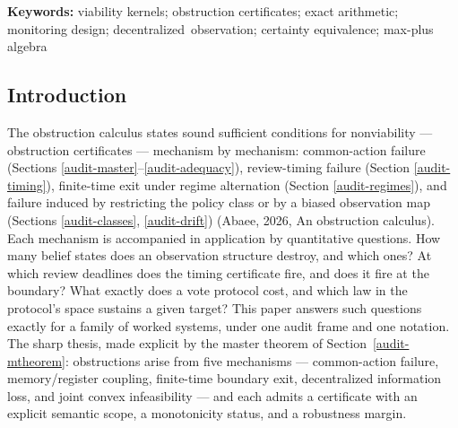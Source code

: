 \documentclass[10pt,twocolumn]{article}
\theoremstyle{plain}
\theoremstyle{definition}
\theoremstyle{remark}
\begin{document}
\begin{abstract}
margin \(0\)); at the audited obstructed aggregate \(Y = 6\) a
rational dual certificate prices the shortfall at margin \(3/50\). Static duality
holds at value \(-1/10\) on the two-floor instance with an \(\ell_1\)-normalized
Farkas pair, and a Helly-tight triple exhibits the sparse \(m{+}1\)-constraint witness. The complete result tables are carried here: the master table
of all 36 belief pairs against the five kernels, the sixteen sustaining
law pairs of the decentralized protocol (an exact \(4 \times 4\)
product), the 93-cell timing grid, the fifteen-partition census with
each fibre's common safe-action set, and the benchmark and drift tables,
with a five-figure set regenerated from the same scripts. Design rules
follow: review deadlines are boundary-inclusive; merged fibres call for
splits, not threshold tuning; aggregated indices support certainly-safe
reporting only; biased observation maps call for structural correction.
\end{abstract}

\textbf{Keywords:} viability kernels; obstruction certificates; exact
arithmetic; monitoring design; \mbox{decentralized observation}; certainty
equivalence; max-plus algebra

\subsection{Introduction}\label{audit-introduction}

The obstruction calculus states sound sufficient conditions for
nonviability --- obstruction certificates --- mechanism by mechanism:
common-action failure (Sections \ref{audit-master}--\ref{audit-adequacy}),
review-timing failure (Section \ref{audit-timing}), finite-time exit under
regime alternation (Section \ref{audit-regimes}), and failure induced by
restricting the policy class or by a biased observation map
(Sections \ref{audit-classes}, \ref{audit-drift}) (Abaee, 2026, An obstruction calculus). Each mechanism is
accompanied in application by quantitative questions. How many belief
states does an observation structure destroy, and which ones? At which
review deadlines does the timing certificate fire, and does it fire at
the boundary? What exactly does a vote protocol cost, and which law in
the protocol's space sustains a given target? This paper answers such
questions exactly for a family of worked systems, under one audit frame
and one notation. The sharp thesis, made explicit by the master
theorem of Section~\ref{audit-mtheorem}: obstructions arise from five
mechanisms --- common-action failure, memory/register coupling,
finite-time boundary exit, decentralized information loss, and joint
convex infeasibility --- and each admits a certificate with an explicit
semantic scope, a monotonicity status, and a robustness margin.
\end{document}
